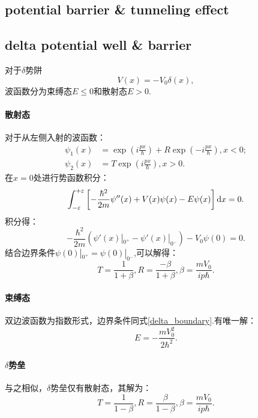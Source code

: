 \subsection{potential barrier \& tunneling effect}
\subsection{delta potential well \& barrier}
对于$\delta$势阱
\begin{equation}
    V(x)=-V_0\delta(x),
\end{equation}
波函数分为束缚态$E\le 0$和散射态$E>0$.

\paragraph{散射态} 对于从左侧入射的波函数：
\begin{align}
    \psi_1(x)&=\exp\left(i\frac{px}{\hbar}\right)+R\exp\left(-i\frac{px}{\hbar}\right),x<0;\\
    \psi_2(x)&=T\exp\left(i\frac{px}{\hbar}\right),  x>0.
\end{align}
在$x=0$处进行势函数积分：
\begin{equation}
    \int_{-\varepsilon}^{+\varepsilon}\left[-\frac{\hbar^2}{2m}\psi''(x)+V(x)\psi(x)-E\psi(x)\right]\mathrm{d} x=0.
\end{equation}
积分得：
\begin{equation}
    -\frac{\hbar^2}{2m}(\psi'(x)|_{0^+}-\psi'(x)|_{0^-})-V_0\psi(0)=0.
    \label{delta_boundary}
\end{equation}
结合边界条件$\psi(0)|_{0^+}=\psi(0)|_{0^-}$,可以解得：
\begin{equation}
    T=\frac{1}{1+\beta}, R=\frac{-\beta}{1+\beta}, \beta=\frac{mV_0}{ip\hbar}.
\end{equation}

\paragraph{束缚态} 双边波函数为指数形式，边界条件同式\ref{delta_boundary}.有唯一解：
\begin{equation}
    E=-\frac{mV_0^2}{2\hbar^2}.
\end{equation}

\paragraph{$\delta$势垒}与之相似，$\delta$势垒仅有散射态，其解为：
\begin{equation}
    T=\frac{1}{1-\beta}, R=\frac{\beta}{1-\beta}, \beta=\frac{mV_0}{ip\hbar}.
\end{equation}
